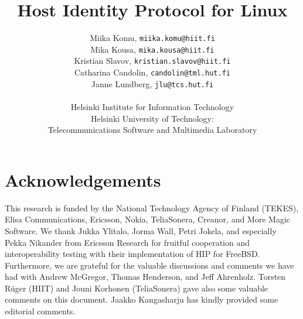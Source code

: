 \documentclass[a4paper,titlepage]{article}
\begin{document}


\title{Host Identity Protocol for Linux}
\author{
        Miika Komu, \texttt{miika.komu@hiit.fi} \\
	Mika Kousa, \texttt{mika.kousa@hiit.fi} \\
	Kristian Slavov, \texttt{kristian.slavov@hiit.fi} \\
        Catharina Candolin, \texttt{candolin@tml.hut.fi} \\
	Janne Lundberg, \texttt{jlu@tcs.hut.fi} \\
	\\
        Helsinki Institute for Information Technology \\       
        Helsinki University of Technology: \\
        Telecommunications Software and Multimedia Laboratory}
\maketitle


\fancyhf{} %
\fancyfoot[C]{ \thepage }
\pagestyle{fancy}

\tableofcontents

\newpage

\section*{Acknowledgements}

This research is funded by the National Technology Agency of Finland
(TEKES), Elisa Communications, Ericsson, Nokia, TeliaSonera, Creanor,
and More Magic Software. We thank Jukka Ylitalo, Jorma Wall, Petri
Jokela, and especially Pekka Nikander from Ericsson Research for
fruitful cooperation and interoperability testing with their
implementation of HIP for FreeBSD. Furthermore, we are grateful for
the valuable discussions and comments we have had with Andrew
McGregor, Thomas Henderson, and Jeff Ahrenholz. Torsten R{\"u}ger
(HIIT) and Jouni Korhonen (TeliaSonera) gave also some valuable
comments on this document. Jaakko Kangasharju has kindly provided some
editorial comments.

\newpage

\end{document}
